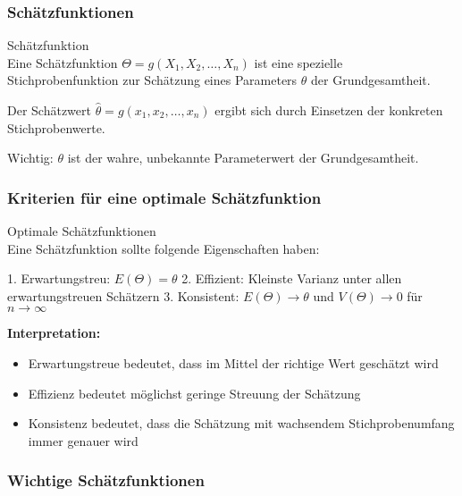 \subsubsection{Schätzfunktionen}

\begin{definition}{Schätzfunktion}\\
Eine Schätzfunktion $\Theta = g(X_1,X_2,\ldots,X_n)$ ist eine spezielle Stichprobenfunktion zur Schätzung eines Parameters $\theta$ der Grundgesamtheit.

Der Schätzwert $\hat{\theta} = g(x_1,x_2,\ldots,x_n)$ ergibt sich durch Einsetzen der konkreten Stichprobenwerte.

Wichtig: $\theta$ ist der wahre, unbekannte Parameterwert der Grundgesamtheit.
\end{definition}

\subsubsection{Kriterien für eine optimale Schätzfunktion}

\begin{concept}{Optimale Schätzfunktionen}\\
Eine Schätzfunktion sollte folgende Eigenschaften haben:

1. Erwartungstreu: $E(\Theta) = \theta$
2. Effizient: Kleinste Varianz unter allen erwartungstreuen Schätzern
3. Konsistent: $E(\Theta) \to \theta$ und $V(\Theta) \to 0$ für $n \to \infty$

\textbf{Interpretation:}
\begin{itemize}
  \item Erwartungstreue bedeutet, dass im Mittel der richtige Wert geschätzt wird
  \item Effizienz bedeutet möglichst geringe Streuung der Schätzung
  \item Konsistenz bedeutet, dass die Schätzung mit wachsendem Stichprobenumfang immer genauer wird
\end{itemize}
\end{concept}

\subsubsection{Wichtige Schätzfunktionen}

